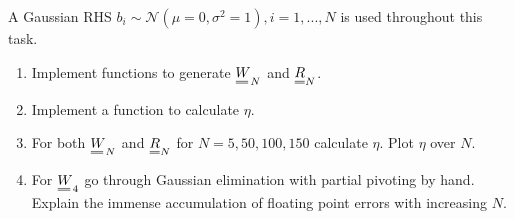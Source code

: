     A Gaussian RHS $b_i \sim \mathcal{N}(\mu = 0,\sigma^2 = 1), i = 1,...,N$ is used throughout this task.

    \begin{enumerate}
        \item Implement functions to generate $\mat{W}_N$ and $\mat{R}_N$.
        \item Implement a function to calculate $\eta$.
        \item For both $\mat{W}_N$ and $\mat{R}_N$ for $N = 5, 50, 100, 150$
        calculate $\eta$. Plot $\eta$ over $N$.
        \item For $\mat{W}_4$ go through Gaussian elimination with partial pivoting by hand.
        Explain the immense accumulation of floating point errors with increasing $N$.
    \end{enumerate}



\pagebreak